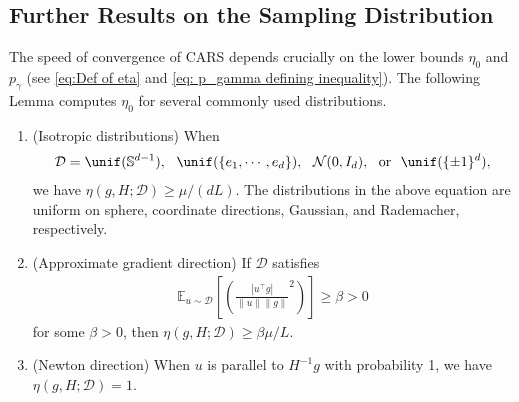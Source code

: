 \subsection{Further Results on the Sampling Distribution}\label{subsec: sampling distribution}
The speed of convergence of CARS depends crucially on the lower bounds $\eta_0$ and $p_{\gamma}$ (see \eqref{eq:Def of eta} and \eqref{eq: p_gamma defining inequality}). The following Lemma computes $\eta_0$ for several commonly used distributions.

\begin{lemma}
    \label{lemma: Lower bound eta}
    \begin{enumerate}
        \item (Isotropic distributions) When
              \begin{align*}
                  \mathcal{D} =  \unif(\mathbb{S}^{d-1}), \textnormal{~~}\unif(\{e_1, \cdots, e_d\}), \textnormal{~~} \mathcal{N}(0, I_d), \textnormal{~~or~~} \unif(\{\pm 1\}^d),
              \end{align*}
              we have $\eta(g,H;\mathcal{D}) \geq {\mu}/({dL})$. The distributions in the above equation are uniform on sphere, coordinate directions, Gaussian, and Rademacher, respectively.
        \item (Approximate gradient direction) If $\mathcal{D}$ satisfies
              \begin{align}\label{eq: D approximates gradient}
                  \mathbb{E}_{u\sim \mathcal{D}}\left[ \left(\frac{|u^\top g|}{\|u\|\|g\|}^2\right) \right] \geq \beta >0
              \end{align}
              for some $\beta>0$,
              then $\eta(g,H;\mathcal{D}) \geq {\beta \mu}/{L}$.
        \item (Newton direction) When $u$ is parallel to $H^{-1}g$ with probability 1, we have $\eta(g,H;\mathcal{D}) = 1$.
    \end{enumerate}
\end{lemma}
